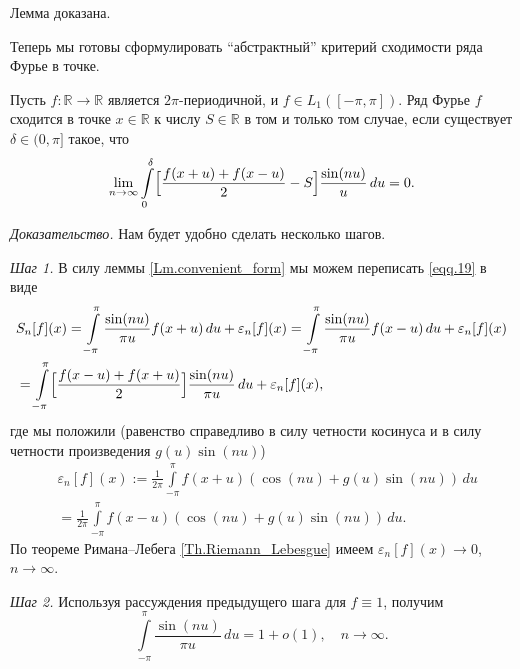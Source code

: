 Лемма доказана.

Теперь мы готовы сформулировать ``абстрактный'' критерий сходимости ряда Фурье в точке.

\begin{theorem}
	\label{Th.abstract_criterion}
	Пусть $f:\mathbb{R} \to \mathbb{R}$ является $2\pi$-периодичной, и $f \in L_{1}([-\pi,\pi])$.
	Ряд Фурье $f$ сходится в точке $x \in \mathbb{R}$ к числу $S \in \mathbb{R}$ в том и только том случае, если существует $\delta \in (0,\pi]$ такое, что
	\begin{equation}
		\label{eqq.22}
		\lim\limits_{n \to \infty}\int\limits_{0}^{\delta}\Bigl[\frac{f(x+u)+f(x-u)}{2}-S\Bigr]\frac{\sin(nu)}{u}\,du = 0.
	\end{equation}
\end{theorem}

\textit{Доказательство.} Нам будет удобно сделать несколько шагов.

\textit{Шаг 1.}
В силу леммы \ref{Lm.convenient_form}  мы можем переписать \eqref{eqq.19} в виде
\begin{equation}
	\label{eqq.23}
	\begin{split}
		&S_{n}[f](x)=\int\limits_{-\pi}^{\pi}\frac{\sin(nu)}{\pi u}f(x+u)\,du + \varepsilon_{n}[f](x) = \int\limits_{-\pi}^{\pi}\frac{\sin(nu)}{\pi u}f(x-u)\,du + \varepsilon_{n}[f](x)\\
		&=\int\limits_{-\pi}^{\pi}\Bigl[\frac{f(x-u)+f(x+u)}{2}\Bigr]\frac{\sin(nu)}{\pi u}\,du + \varepsilon_{n}[f](x),
	\end{split}
\end{equation}
где мы положили (равенство справедливо в силу четности косинуса и в силу четности произведения $g(u)\sin(nu)$)
\begin{equation}
	\label{eqq.24}
	\begin{split}
		&\varepsilon_{n}[f](x):=\frac{1}{2\pi}\int\limits_{-\pi}^{\pi}f(x+u)(\cos(nu)+g(u)\sin(nu))\,du\\
		&=\frac{1}{2\pi}\int\limits_{-\pi}^{\pi}f(x-u)(\cos(nu)+g(u)\sin(nu))\,du.
	\end{split}
\end{equation}
По теореме Римана--Лебега \ref{Th.Riemann_Lebesgue} имеем $\varepsilon_{n}[f](x) \to 0$, $n \to \infty$.

\textit{Шаг 2.} Используя рассуждения предыдущего шага для $f \equiv 1$, получим
\begin{equation}
	\label{eqq.25}
	\int\limits_{-\pi}^{\pi}\frac{\sin(nu)}{\pi u}\,du = 1 + o(1), \quad n \to \infty.
\end{equation}


